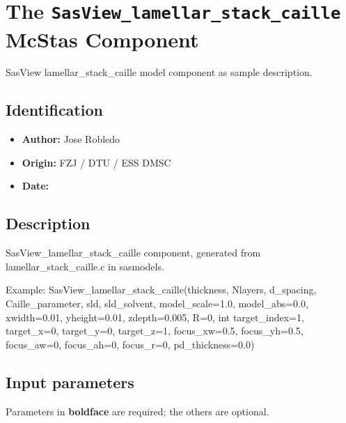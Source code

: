 \section{The \texttt{SasView\_lamellar\_stack\_caille} McStas Component}
SasView lamellar\_stack\_caille model component as sample description.

\subsection*{Identification}
\begin{itemize}
  \item \textbf{Author:} Jose Robledo
  \item \textbf{Origin:} FZJ / DTU / ESS DMSC
  \item \textbf{Date:} 
\end{itemize}

\subsection*{Description}
SasView\_lamellar\_stack\_caille component, generated from lamellar\_stack\_caille.c in sasmodels.

Example: SasView\_lamellar\_stack\_caille(thickness, Nlayers, d\_spacing, Caille\_parameter, sld, sld\_solvent, model\_scale=1.0, model\_abs=0.0, xwidth=0.01, yheight=0.01, zdepth=0.005, R=0, int target\_index=1, target\_x=0, target\_y=0, target\_z=1, focus\_xw=0.5, focus\_yh=0.5, focus\_aw=0, focus\_ah=0, focus\_r=0, pd\_thickness=0.0)

\subsection*{Input parameters}
Parameters in \textbf{boldface} are required; the others are optional.

